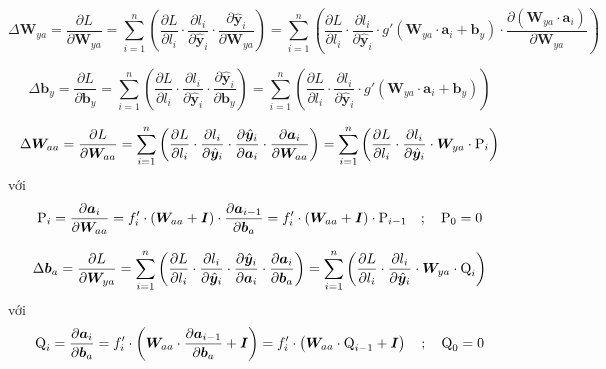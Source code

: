     $$\Delta \bm W_{ya} = \frac{\partial L}{\partial \bm W_{ya}}  = \sum_{i=1}^{n}\left(
        \frac{\partial L}{\partial l_i} \cdot
        \frac{\partial l_i}{\partial \hat{\bm y}_i} \cdot
        \frac{\partial \hat{\bm y}_i}{\partial \bm W_{ya}}
     \right) = \sum_{i=1}^{n}\left(
        \frac{\partial L}{\partial l_i} \cdot
        \frac{\partial l_i}{\partial \hat{\bm y}_i} \cdot
        g'(\bm W_{ya}\cdot\bm a_i + \bm b_y) \cdot
        \frac{\partial (\bm W_{ya}\cdot\bm a_i)}{\partial \bm W_{ya}}
     \right)$$

     $$\Delta \bm b_y = \frac{\partial L}{\partial \bm b_y}  = \sum_{i=1}^{n}\left(
        \frac{\partial L}{\partial l_i} \cdot
        \frac{\partial l_i}{\partial \hat{\bm y}_i} \cdot
        \frac{\partial \hat{\bm y}_i}{\partial \bm b_y}
     \right) = \sum_{i=1}^{n}\left(
        \frac{\partial L}{\partial l_i} \cdot
        \frac{\partial l_i}{\partial \hat{\bm y}_i} \cdot
        g'(\bm W_{ya}\cdot\bm a_i + \bm b_y)
     \right)$$

     $$\Delta \bm W_{aa} = \frac{\partial L}{\partial \bm W_{aa}}  = \sum_{i=1}^{n}\left(
        \frac{\partial L}{\partial l_i} \cdot
        \frac{\partial l_i}{\partial \hat{\bm y}_i} \cdot
        \frac{\partial \hat{\bm y}_i}{\partial \bm a_i} \cdot
        \frac{\partial \bm a_i}{\partial \bm W_{aa}}
     \right) = \sum_{i=1}^{n}\left(
        \frac{\partial L}{\partial l_i} \cdot
        \frac{\partial l_i}{\partial \hat{\bm y}_i} \cdot
        \bm W_{ya} \cdot \text P_i
     \right)$$
     với 
     $$\text P_i = \frac{\partial \bm a_i}{\partial \bm W_{aa}} = f_i' \cdot \left(\bm W_{aa}  + \bm I \right)\cdot \frac{\partial \bm a_{i-1}}{\partial \bm b_a} = f_i' \cdot \left(\bm W_{aa}  + \bm I \right)\cdot \text P_{i-1} \quad ;\quad  \text P_0 = 0 $$

     $$\Delta \bm b_a = \frac{\partial L}{\partial \bm W_{ya}}  = \sum_{i=1}^{n}\left(
        \frac{\partial L}{\partial l_i} \cdot
        \frac{\partial l_i}{\partial \hat{\bm y}_i} \cdot
        \frac{\partial \hat{\bm y}_i}{\partial \bm a_i} \cdot
        \frac{\partial \bm a_i}{\partial \bm b_a}
     \right) = \sum_{i=1}^{n}\left( 
        \frac{\partial L}{\partial l_i} \cdot
        \frac{\partial l_i}{\partial \hat{\bm y}_i} \cdot
        \bm W_{ya} \cdot \text Q_i
     \right)$$
     với 
     $$\text Q_i = \frac{\partial \bm a_i}{\partial \bm b_a} = f_i' \cdot \left(\bm W_{aa} \cdot \frac{\partial \bm a_{i-1}}{\partial \bm b_a} + \bm I \right) = f_i' \cdot \left(\bm W_{aa} \cdot \text Q_{i-1} + \bm I \right)\quad ;\quad \text Q_0 = 0 $$

